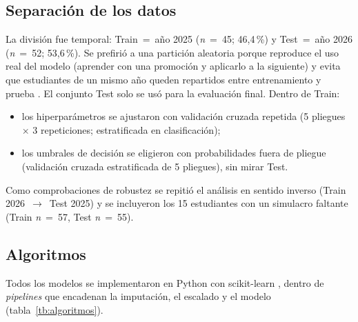 \documentclass[10pt,letterpaper,twocolumn]{article}
\newcommand{\parencite}{\citep}
\begin{document}
\subsection{Separación de los datos}

La división fue temporal: Train~=~año 2025 (\textit{n}~=~45; 46,4\,\%) y Test~=~año 2026 (\textit{n}~=~52; 53,6\,\%). Se prefirió a una partición aleatoria porque reproduce el uso real del modelo (aprender con una promoción y aplicarlo a la siguiente) y evita que estudiantes de un mismo año queden repartidos entre entrenamiento y prueba \parencite{hastie2009elements,kaufman2012leakage}. El conjunto Test solo se usó para la evaluación final. Dentro de Train:

\begin{itemize}
    \item los hiperparámetros se ajustaron con validación cruzada repetida (5 pliegues $\times$ 3 repeticiones; estratificada en clasificación);
    \item los umbrales de decisión se eligieron con probabilidades fuera de pliegue (validación cruzada estratificada de 5 pliegues), sin mirar Test.
\end{itemize}

Como comprobaciones de robustez se repitió el análisis en sentido inverso (Train 2026~$\rightarrow$~Test 2025) y se incluyeron los 15 estudiantes con un simulacro faltante (Train \textit{n}~=~57, Test \textit{n}~=~55).

\subsection{Algoritmos}

Todos los modelos se implementaron en Python con scikit-learn \parencite{pedregosa2011scikit}, dentro de \textit{pipelines} que encadenan la imputación, el escalado y el modelo (tabla~\ref{tb:algoritmos}).
\end{document}
